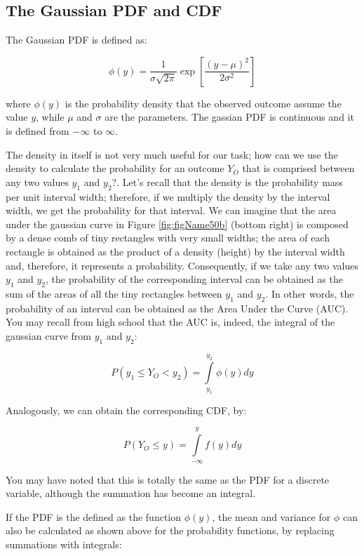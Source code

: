 \documentclass[a4paper,12pt,oneside]{book}
\begin{document}
\hypertarget{the-gaussian-pdf-and-cdf}{%
\subsection{The Gaussian PDF and CDF}\label{the-gaussian-pdf-and-cdf}}

The Gaussian PDF is defined as:

\[\phi(y) = \frac{1}{{\sigma \sqrt {2\pi } }}\exp \left[{\frac{\left( {y - \mu } \right)^2 }{2\sigma ^2 }} \right]\]

where \(\phi(y)\) is the probability density that the observed outcome assume the value \(y\), while \(\mu\) and \(\sigma\) are the parameters. The gassian PDF is continuous and it is defined from \(-\infty\) to \(\infty\).

The density in itself is not very much useful for our task; how can we use the density to calculate the probability for an outcome \(Y_O\) that is comprised between any two values \(y_1\) and \(y_2\)?. Let's recall that the density is the probability mass per unit interval width; therefore, if we multiply the density by the interval width, we get the probability for that interval. We can imagine that the area under the gaussian curve in Figure \ref{fig:figName50b} (bottom right) is composed by a dense comb of tiny rectangles with very small widths; the area of each rectangle is obtained as the product of a density (height) by the interval width and, therefore, it represents a probability. Consequently, if we take any two values \(y_1\) and \(y_2\), the probability of the corresponding interval can be obtained as the sum of the areas of all the tiny rectangles between \(y_1\) and \(y_2\). In other words, the probability of an interval can be obtained as the Area Under the Curve (AUC). You may recall from high school that the AUC is, indeed, the integral of the gaussian curve from \(y_1\) and \(y_2\):

\[P(y_1 \le Y_O < y_2) = \int\limits_{ y_1 }^{y_2} {\phi(y)} dy\]

Analogously, we can obtain the corresponding CDF, by:

\[P(Y_O \le y) = \int\limits_{ -\infty }^{y} {f(y)} dy\]

You may have noted that this is totally the same as the PDF for a discrete variable, although the summation has become an integral.

If the PDF is the defined as the function \(\phi(y)\), the mean and variance for \(\phi\) can also be calculated as shown above for the probability functions, by replacing summations with integrals:
\end{document}
